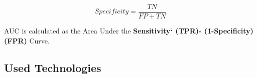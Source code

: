 \begin{equation} \label{eq: Specificity}
    Specificity = \frac{TN}{FP+TN}
\end{equation}

AUC is calculated as the Area Under the \textbf{Sensitivity` (TPR)- (1-Specificity)(FPR)} Curve.


\subsection{Used Technologies}\label{subsec:used-technologies}
